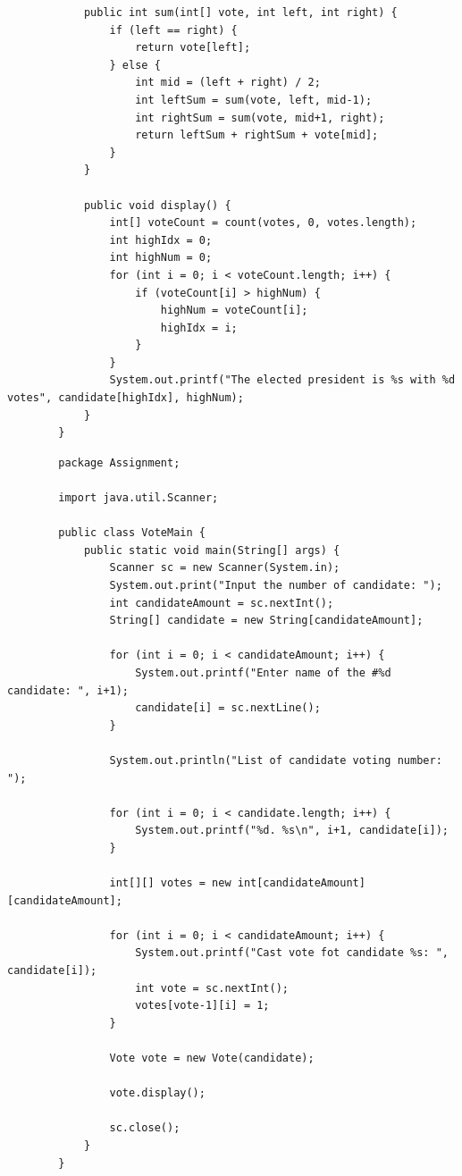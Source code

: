 \documentclass[12pt,titlepage]{article}
\begin{document}
\begin{enumerate}
\begin{verbatim}
            public int sum(int[] vote, int left, int right) {
                if (left == right) {
                    return vote[left];
                } else {
                    int mid = (left + right) / 2;
                    int leftSum = sum(vote, left, mid-1);
                    int rightSum = sum(vote, mid+1, right);
                    return leftSum + rightSum + vote[mid];
                }
            }

            public void display() {
                int[] voteCount = count(votes, 0, votes.length);
                int highIdx = 0;
                int highNum = 0;
                for (int i = 0; i < voteCount.length; i++) {
                    if (voteCount[i] > highNum) {
                        highNum = voteCount[i];
                        highIdx = i;
                    }
                }
                System.out.printf("The elected president is %s with %d votes", candidate[highIdx], highNum);
            }
        }
    \end{verbatim}
    \begin{verbatim}
        package Assignment;

        import java.util.Scanner;

        public class VoteMain {
            public static void main(String[] args) {
                Scanner sc = new Scanner(System.in);
                System.out.print("Input the number of candidate: ");
                int candidateAmount = sc.nextInt();
                String[] candidate = new String[candidateAmount];

                for (int i = 0; i < candidateAmount; i++) {
                    System.out.printf("Enter name of the #%d candidate: ", i+1);
                    candidate[i] = sc.nextLine();
                }

                System.out.println("List of candidate voting number: ");

                for (int i = 0; i < candidate.length; i++) {
                    System.out.printf("%d. %s\n", i+1, candidate[i]);
                }

                int[][] votes = new int[candidateAmount][candidateAmount];

                for (int i = 0; i < candidateAmount; i++) {
                    System.out.printf("Cast vote fot candidate %s: ", candidate[i]);
                    int vote = sc.nextInt();
                    votes[vote-1][i] = 1;
                }

                Vote vote = new Vote(candidate);

                vote.display();

                sc.close();
            }
        }
    \end{verbatim}
\end{enumerate}
\end{document}
